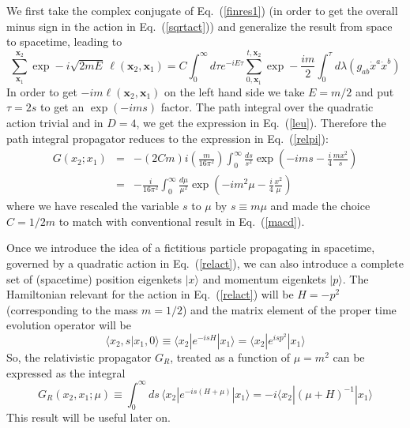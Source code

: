 \documentclass{article}
\def\eq#1{{Eq.~(\ref{#1})}}
\def\ket#1{|#1\rangle}                    %
\def\bk#1#2#3{{\langle #1|#2|#3\rangle}}  %
\def\amp#1#2{\langle #1 | #2\rangle}      %
\begin{document}
We first take the complex conjugate of \eq{finres1} (in order to get the overall minus sign in the action in \eq{sqrtact}) and generalize the result from space to spacetime, 
leading to 
\begin{equation}
 \sum_{\bm{x}_1}^{\bm{x}_2} \exp -i\sqrt{2mE}\, \ell(\bm{x}_2,\bm{x}_1) = C \int_0^\infty d\tau  e^{-iE\tau}\sum_{0,\bm{x}_1}^{t,\bm{x}_2}\exp-\frac{im}{2} \int_0^\tau d\lambda \left( g_{ab} \dot x^a\dot  x^b\right)
\label{finres2}
\end{equation} 
In order to get $-im\ell(\bm{x}_2,\bm{x}_1)$ on the left hand side we take $E=m/2$ and put $\tau=2s$ to get an $\exp(-ims)$ factor.
The path integral over the quadratic action trivial and in $D=4$, we get the expression in \eq{leu}.
Therefore the path integral propagator reduces to the expression in \eq{relpi}:
\begin{eqnarray}
 G(x_2;x_1) &=& -(2Cm) i\left(\frac{m}{16\pi^2}\right)\int_0^\infty \frac{ds}{s^2} \exp\left( -ims - \frac{i}{4} \frac{mx^2}{s}\right)\nonumber\\
 &=& - \frac{i}{16\pi^2}\int_0^\infty\frac{d\mu}{\mu^2}  \exp\left( -im^2\mu - \frac{i}{4} \frac{x^2}{\mu}\right)
\label{rpi1}
\end{eqnarray} 
where we have  rescaled the variable $s$ to $\mu$ by $s\equiv m\mu$ and made the choice $C=1/2m$ to  match with conventional result in \eq{macd}.

Once we introduce the idea of a fictitious particle propagating in spacetime, governed by a quadratic action in \eq{relact}, we can also introduce a complete set of (spacetime) position eigenkets $\ket{x}$ and momentum eigenkets $\ket{p}$. The Hamiltonian relevant for the action in  
\eq{relact} will be $H=-p^2$ (corresponding to the mass $m=1/2$) and the matrix element of the proper time evolution operator will be
\begin{equation}
\amp{x_2,s}{x_1,0}\equiv \bk{x_2}{e^{-isH}}{x_1}=\bk{x_2}{e^{isp^2}}{x_1}                                                  
\end{equation} 
So, the relativistic propagator $G_R$, treated as a function of $\mu =m^2$ can be expressed as the integral 
\begin{equation}
 G_R (x_2, x_1; \mu) \equiv \int_0^\infty ds\,  \bk{x_2}{e^{-is (H+\mu)}}{x_1} = - i \bk{x_2}{(\mu + H)^{-1}}{x_1}
 \label{why1}
\end{equation} 
This result will be useful later on.
\end{document}
